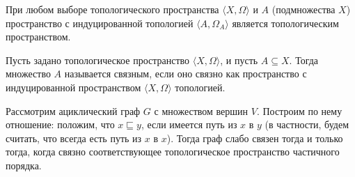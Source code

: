 \begin{theorem} При любом выборе топологического пространства $\langle X, \Omega \rangle$ и 
$A$ (подмножества $X$) пространство с индуцированной топологией 
$\langle A, \Omega_A \rangle$ является топологическим пространством.
\end{theorem}


\begin{definition} Пусть задано топологическое пространство $\langle X, \Omega \rangle$, и пусть
$A \subseteq X$. Тогда множество $A$ называется связным, если оно связно как пространство
с индуцированной пространством $\langle X, \Omega \rangle$ топологией.
\end{definition}

\begin{theorem} Рассмотрим ациклический граф $G$ с множеством вершин $V$. 
Построим по нему
отношение: положим, что $x \sqsubseteq y$, если имеется путь из $x$ в $y$
(в частности, будем считать, что всегда есть путь из $x$ в $x$).
Тогда граф слабо связен тогда и только тогда, когда связно соответствующее 
топологическое пространство частичного порядка. 
\end{theorem}
